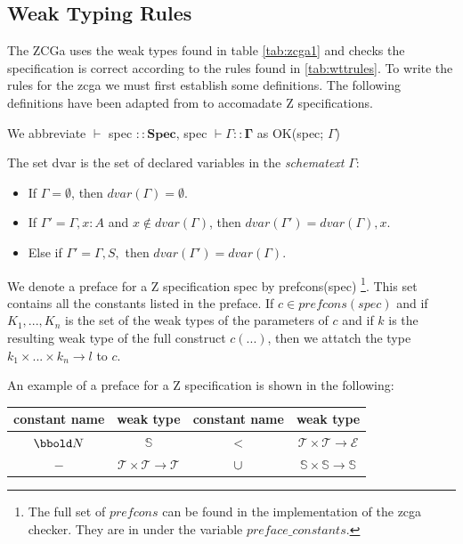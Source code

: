 \subsection{Weak Typing Rules}

The ZCGa uses the weak types found in table \ref{tab:zcga1} and checks the specification is correct according to the rules found in \ref{tab:wttrules}. To write the rules for the \gls{zcga} we must first establish some definitions. The following definitions have been adapted from \cite{wtt} to accomadate Z specifications.

\begin{defin}
We abbreviate $\vdash$ spec $\mathbf{::Spec}$, spec $\vdash \Gamma \mathbf{::\Gamma}$ as OK(spec; $\Gamma$)
\end{defin}

\begin{defin} The set dvar is the set of declared variables in the \emph{schematext} $\Gamma$:
\begin{itemize}
\item If $\Gamma = \emptyset$, then $dvar(\Gamma) = \emptyset$.
\item If $\Gamma' = \Gamma, x:A$ and $x \notin dvar(\Gamma)$, then $dvar(\Gamma') = dvar(\Gamma), x$.
\item Else if $\Gamma' =\Gamma,S,$ then $dvar(\Gamma') = dvar(\Gamma)$.
\end{itemize}
\end{defin}

\begin{defin} We denote a preface for a Z specification spec by prefcons(spec) \footnote{The full set of $prefcons$ can be found in the implementation of the \gls{zcga} checker. They are in under the variable $preface\_constants$.}. This set contains all the constants listed in the preface. If $c \in prefcons(spec)$ and if $K_{1},...,K_{n}$ is the set of the weak types of the parameters of $c$ and if $k$ is the resulting weak type of the full construct $c(...)$, then we attatch the type $k_{1} \times ... \times k_{n} \rightarrow l$ to $c$.
\end{defin}

\begin{exam}

\end{exam} An example of a preface for a Z specification is shown in the following:

\begin{tabular}{| c | c || c | c |}
\hline
constant name & weak type & constant name & weak type \\
\hline
$\nat$ & $\mathbb{S}$ 
& $<$ & $\mathcal{T} \times \mathcal{T} \rightarrow \mathcal{E}$ \\
$-$ & $\mathcal{T} \times \mathcal{T} \rightarrow \mathcal{T}$ 
& $\cup$ & $\mathbb{S} \times \mathbb{S} \rightarrow \mathbb{S} $ \\
\hline
\end{tabular}

